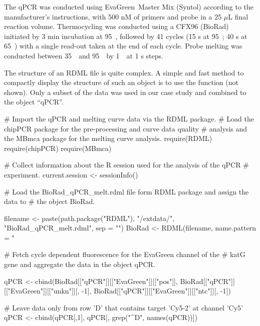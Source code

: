 The qPCR was conducted using EvaGreen\circledR~Master Mix (Syntol) according to 
the manufacturer's instructions, with 500 nM of primers and probe in a 25 $\mu$L 
final reaction volume. Thermocycling was conducted using a CFX96 (BioRad) 
initiated by 3 min incubation at 95~\textcelsius, followed by 41 cycles (15 s at 
95~\textcelsius; 40 s at 65~\textcelsius) with a single read-out 
taken at the end of each cycle. Probe melting was conducted between 
35~\textcelsius~and 95~\textcelsius~by 1~\textcelsius~at 1 s steps.

The structure of an RDML file is quite complex. A simple and fast method to 
compactly display the structure of such an object is to use the  
function (not shown). Only a subset of the data was used in our case study 
and combined to the object ``qPCR''.

\begin{example}
# Import the qPCR and melting curve data via the RDML package.
# Load the chipPCR package for the pre-processing and curve data quality
# analysis and the MBmca package for the melting curve analysis.
require(RDML)
require(chipPCR)
require(MBmca)

# Collect information about the R session used for the analysis of the qPCR
# experiment.
current.session <- sessionInfo()

# Load the BioRad_qPCR_melt.rdml file form RDML package and assign the data to 
# the object BioRad.

filename <- paste(path.package("RDML"), "/extdata/", 
		  "BioRad_qPCR_melt.rdml", sep = "")
BioRad <- RDML(filename, name.pattern = "%

# Fetch cycle dependent fluorescence for the EvaGreen channel of the 
# katG gene and aggregate the data in the object qPCR.

qPCR <- cbind(BioRad[["qPCR"]][["EvaGreen"]][["pos"]], 
	      BioRad[["qPCR"]][["EvaGreen"]][["unkn"]][, -1], 
	      BioRad[["qPCR"]][["EvaGreen"]][["ntc"]][, -1])
	      
# Leave data only from row 'D' that contains target 'Cy5-2' at channel 'Cy5'
qPCR <- cbind(qPCR[,1], qPCR[, grep("^D", names(qPCR))])
\end{example}

